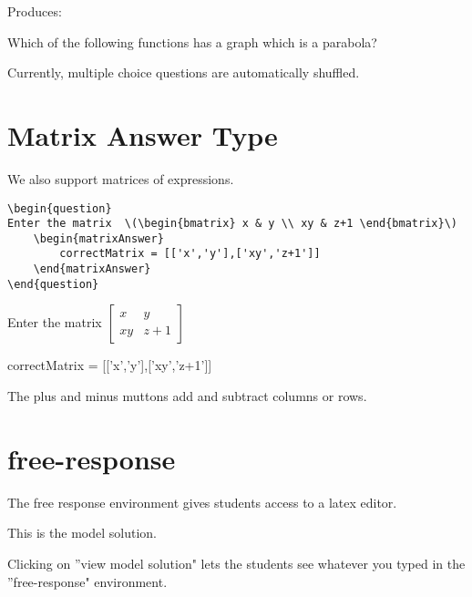 \documentclass{ximera}
\begin{document}
Produces:

\begin{question}
	Which of the following functions has a graph which is a parabola?
	\begin{multipleChoice}
	\end{multipleChoice}
\end{question}

Currently, multiple choice questions are automatically shuffled.

\section{Matrix Answer Type}

We also support matrices of expressions.

\begin{verbatim}
\begin{question}
Enter the matrix  \(\begin{bmatrix} x & y \\ xy & z+1 \end{bmatrix}\)
    \begin{matrixAnswer}
	    correctMatrix = [['x','y'],['xy','z+1']]
    \end{matrixAnswer}
\end{question}
\end{verbatim}

\begin{question}
Enter the matrix  \(\begin{bmatrix} x & y \\ xy & z+1 \end{bmatrix}\)
    \begin{matrixAnswer}
	    correctMatrix = [['x','y'],['xy','z+1']]
    \end{matrixAnswer}
\end{question}

The plus and minus muttons add and subtract columns or rows.  

\section{free-response}

The free response environment gives students access to a latex editor. 

\begin{free-response}
	This is the model solution.
\end{free-response}

Clicking on ''view model solution" lets the students see whatever you typed in the ''free-response" environment.
	
\end{document}
